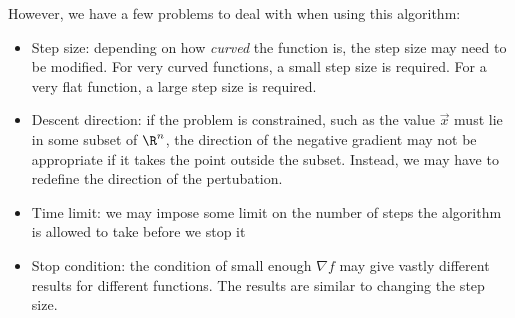 \documentclass[../Main.tex]{subfiles}
\begin{document}
However, we have a few problems to deal with when using this algorithm:
\begin{itemize}
    \item Step size: depending on how \textit{curved} the function is, the step size may need to be modified. For very curved functions, a small step size is required. For a very flat function, a large step size is required.
    \item Descent direction: if the problem is constrained, such as the value $\vec{x}$ must lie in some subset of $\R^n$, the direction of the negative gradient may not be appropriate if it takes the point outside the subset. Instead, we may have to redefine the direction of the pertubation.
    \item Time limit: we may impose some limit on the number of steps the algorithm is allowed to take before we stop it
    \item Stop condition: the condition of small enough $\nabla f$ may give vastly different results for different functions. The results are similar to changing the step size.
\end{itemize}
\end{document}
